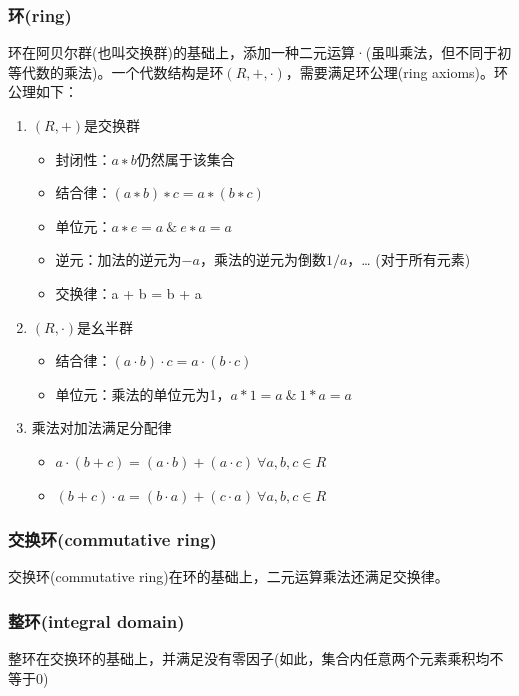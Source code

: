 \documentclass[12pt]{article}
\begin{document}
\subsubsection{环(ring)}
环在阿贝尔群(也叫交换群)的基础上，添加一种二元运算·(虽叫乘法，但不同于初等代数的乘法)。一个代数结构是环$(R, +, ·)$，需要满足环公理(ring axioms)。环公理如下：
\begin{enumerate}
\setlength{\itemsep}{0pt}
\setlength{\parsep}{0pt}
\setlength{\parskip}{0pt}
\item $(R, +)$是交换群
	\begin{itemize}
	\setlength{\itemsep}{0pt}
	\setlength{\parsep}{0pt}
	\setlength{\parskip}{0pt}
	\item 封闭性：$a ∗ b$仍然属于该集合
	\item 结合律：$(a ∗ b) ∗ c = a ∗ (b ∗ c)$
	\item 单位元：$a ∗ e = a   \ \& \  e ∗ a = a$
	\item 逆元：加法的逆元为$-a$，乘法的逆元为倒数$1/a$，… (对于所有元素)
	\item 交换律：a + b = b + a
	\end{itemize}

\item $(R, ·)$是幺半群
	\begin{itemize}
	\setlength{\itemsep}{0pt}
	\setlength{\parsep}{0pt}
	\setlength{\parskip}{0pt}
	\item 结合律：$(a ⋅ b) ⋅ c = a ⋅ (b ⋅ c)$
	\item 单位元：乘法的单位元为1，$a * 1 = a   \ \& \  1 * a = a$
	\end{itemize}
	
\item 乘法对加法满足分配律
	\begin{itemize}
	\setlength{\itemsep}{0pt}
	\setlength{\parsep}{0pt}
	\setlength{\parskip}{0pt}
	\item $a ⋅ (b + c) = (a ⋅ b) + (a ⋅ c) \ \forall a, b, c \in R$
	\item $(b + c) ⋅ a = (b ⋅ a) + (c ⋅ a) \ \forall a, b, c \in R $
	\end{itemize}
\end{enumerate}

\subsubsection{交换环(commutative ring)}
交换环(commutative ring)在环的基础上，二元运算乘法还满足交换律。

\subsubsection{整环(integral domain)}
整环在交换环的基础上，并满足没有零因子(如此，集合内任意两个元素乘积均不等于0)
\end{document}
